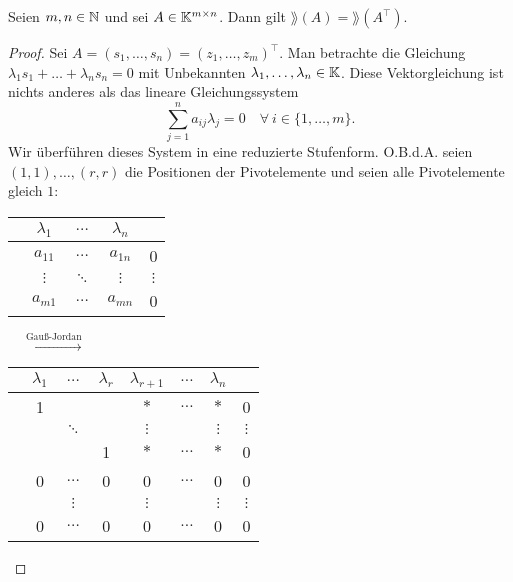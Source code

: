 \begin{thm}
	Seien $ m,n \in \mathbb N $ und sei $ A \in \mathbb K^{m \times n} $. Dann gilt $ \rang(A) = \rang(A^\top) $.
\end{thm}
\begin{proof}
	Sei $ A = (s_1, \ldots, s_n) = (z_1, \ldots, z_m)^\top $. Man betrachte die Gleichung $ \lambda_1s_1 + \ldots + \lambda_ns_n = 0 $ mit Unbekannten $ \lambda_1, \ldots, \lambda_n \in \mathbb K $. Diese Vektorgleichung ist nichts anderes als das lineare Gleichungssystem
	\begin{equation*}
		\sum\limits_{j=1}^{n} a_{ij}\lambda_j = 0 \quad \forall \: i \in \{ 1, \ldots, m \}.
	\end{equation*}
	Wir überführen dieses System in eine reduzierte Stufenform. O.B.d.A. seien $ (1,1), \ldots, (r,r) $ die Positionen der Pivotelemente und seien alle Pivotelemente gleich $1$: 
	\begin{center}
	\begin{tabular}{c|ccc|c}
		& $ \lambda_1 $ & $ \ldots $ & $ \lambda_n $ & \\
		\hline
		& $ a_{11} $ & $ \ldots $ & $ a_{1n} $ & 0 \\
		& $ \vdots $ & $ \ddots $ & $ \vdots $ & $ \vdots $ \\
		& $ a_{m1} $ & $ \ldots $ & $ a_{mn} $ & 0
	\end{tabular}	
	$ \quad \xrightarrow{\text{Gauß-Jordan}}  $
	\begin{tabular}{c|cccccc|c}
		& $ \lambda_1 $ & $ \ldots $ & $ \lambda_r $ & $\lambda_{r+1}$ & $\ldots$ & $\lambda_n$ & \\
		\hline
		& 1 & & & $\ast$ & $\ldots$ & $\ast$ & 0 \\
		& & $ \ddots $ & & $ \vdots $ & & $\vdots$ & $\vdots$ \\
		& & & 1 & $\ast$ & $\ldots$ &  $\ast$ & 0 \\
		& 0 & $\ldots$ & 0 & 0 & $\ldots$ &  0 & 0 \\
		& & $ \vdots $ & & $ \vdots $ & & $\vdots$ & $\vdots$ \\
		& 0 & $\ldots$ & 0 & 0 & $\ldots$ &  0 & 0 
	\end{tabular}
	\end{center}
	

\end{proof}
